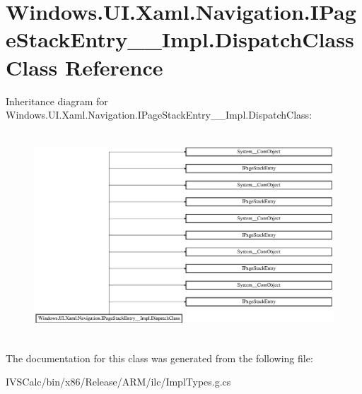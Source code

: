 \hypertarget{class_windows_1_1_u_i_1_1_xaml_1_1_navigation_1_1_i_page_stack_entry_____impl_1_1_dispatch_class}{}\section{Windows.\+U\+I.\+Xaml.\+Navigation.\+I\+Page\+Stack\+Entry\+\_\+\+\_\+\+Impl.\+Dispatch\+Class Class Reference}
\label{class_windows_1_1_u_i_1_1_xaml_1_1_navigation_1_1_i_page_stack_entry_____impl_1_1_dispatch_class}
Inheritance diagram for Windows.\+U\+I.\+Xaml.\+Navigation.\+I\+Page\+Stack\+Entry\+\_\+\+\_\+\+Impl.\+Dispatch\+Class\+:\begin{figure}[H]
\begin{center}
\leavevmode
\includegraphics[height=7.738694cm]{class_windows_1_1_u_i_1_1_xaml_1_1_navigation_1_1_i_page_stack_entry_____impl_1_1_dispatch_class}
\end{center}
\end{figure}


The documentation for this class was generated from the following file\+:\begin{DoxyCompactItemize}
\item 
I\+V\+S\+Calc/bin/x86/\+Release/\+A\+R\+M/ilc/Impl\+Types.\+g.\+cs\end{DoxyCompactItemize}
